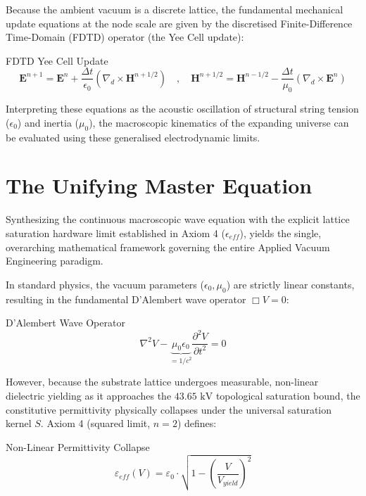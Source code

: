 Because the ambient vacuum is a discrete lattice, the fundamental mechanical update equations at the node scale are given by the discretised Finite-Difference Time-Domain (FDTD) operator (the Yee Cell update):
\begin{resultbox}{FDTD Yee Cell Update}
\begin{equation}
    \mathbf{E}^{n+1} = \mathbf{E}^n + \frac{\Delta t}{\epsilon_0} (\nabla_d \times \mathbf{H}^{n+1/2}) \quad , \quad \mathbf{H}^{n+1/2} = \mathbf{H}^{n-1/2} - \frac{\Delta t}{\mu_0} (\nabla_d \times \mathbf{E}^n)
\end{equation}
\end{resultbox}

Interpreting these equations as the acoustic oscillation of structural string tension ($\epsilon_0$) and inertia ($\mu_0$), the macroscopic kinematics of the expanding universe can be evaluated using these generalised electrodynamic limits.

\section{The Unifying Master Equation}
Synthesizing the continuous macroscopic wave equation with the explicit lattice saturation hardware limit established in Axiom 4 ($\epsilon_{eff}$), yields the single, overarching mathematical framework governing the entire Applied Vacuum Engineering paradigm.

In standard physics, the vacuum parameters ($\epsilon_0, \mu_0$) are strictly linear constants, resulting in the fundamental D'Alembert wave operator $\Box V = 0$:
\begin{resultbox}{D'Alembert Wave Operator}
\begin{equation}
\nabla^2 V - \underbrace{\mu_0 \epsilon_0}_{= 1/c^2} \frac{\partial^2 V}{\partial t^2} = 0
\end{equation}
\end{resultbox}

However, because the substrate lattice undergoes measurable, non-linear dielectric yielding as it approaches the $43.65\text{ kV}$ topological saturation bound, the constitutive permittivity physically collapses under the universal saturation kernel $S$. Axiom 4 (squared limit, $n=2$) defines:
\begin{resultbox}{Non-Linear Permittivity Collapse}
\begin{equation}
\varepsilon_{eff}(V) = \varepsilon_0 \cdot \sqrt{1 - \left(\frac{V}{V_{yield}}\right)^2}
\end{equation}
\end{resultbox}

